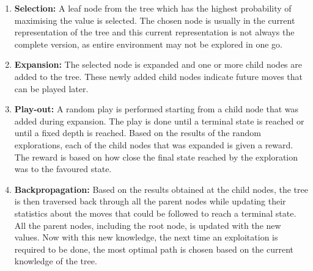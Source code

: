 \documentclass{svproc}
\begin{document}
    \begin{enumerate}

        \item \textbf{{Selection:}} A leaf node from the tree which has the highest probability of maximising the value is selected. The chosen node is usually in the current representation of the tree and this current representation is not always the complete version, as entire environment may not be explored in one go.

        \item \textbf{{Expansion:}} The selected node is expanded and one or more child nodes are added to the tree. These newly added child nodes indicate future moves that can be played later.

        \item \textbf{{Play-out:}} A random play is performed starting from a child node that was added during expansion. The play is done until a terminal state is reached or until a fixed depth is reached. Based on the results of the random explorations, each of the child nodes that was expanded is given a reward. The reward is based on how close the final state reached by the exploration was to the favoured state.

        \item \textbf{{Backpropagation:}} Based on the results obtained at the child nodes, the tree is then traversed back through all the parent nodes while updating their statistics about the moves that could be followed to reach a terminal state. All the parent nodes, including the root node, is updated with the new values. Now with this new knowledge, the next time an exploitation is required to be done, the most optimal path is chosen based on the current knowledge of the tree.

    \end{enumerate}





\end{document}

